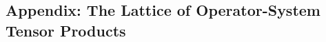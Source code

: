 \documentclass[main.tex]{subfiles}
\begin{document}
\newpage
\subsection[Appendix: Tensor-Product Lattice]{Appendix: The Lattice of Operator-System Tensor Products}
\label{subsec:operator-system-tensor-product-appendix}

\end{document}
